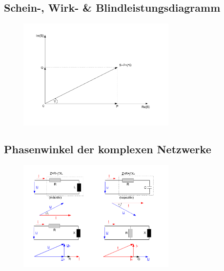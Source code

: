\documentclass[a4paper, 11pt]{article}
\begin{document}
\begin{spacing}{0.1}
\subsection*{Schein-, Wirk- \& Blindleistungsdiagramm}
\begin{figure}[H]
	\centering
	\includegraphics[width=0.7\textwidth]{img/drehstrom_komplexe_leistung.pdf}
\end{figure}
\subsection*{Phasenwinkel der komplexen Netzwerke}
\begin{figure}[H]
	\centering
	\includegraphics[width=0.7\textwidth]{img/drehstrom_Phasenwinkel.pdf}
\end{figure}
\end{spacing}
\end{document}
